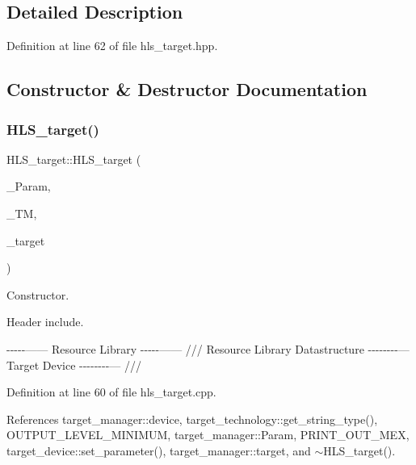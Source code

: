 \subsection{Detailed Description}


Definition at line 62 of file hls\+\_\+target.\+hpp.



\subsection{Constructor \& Destructor Documentation}
\mbox{\label{classHLS__target_ac3a4f4a023bf8fceb35226d71bf2ad44}} 
\subsubsection{\texorpdfstring{H\+L\+S\+\_\+target()}{HLS\_target()}}
{\footnotesize\ttfamily H\+L\+S\+\_\+target\+::\+H\+L\+S\+\_\+target (\begin{DoxyParamCaption}\item[{const \hyperlink{Parameter_8hpp_a37841774a6fcb479b597fdf8955eb4ea}{Parameter\+Const\+Ref} \&}]{\+\_\+\+Param,  }\item[{const \hyperlink{technology__manager_8hpp_a4b9ecd440c804109c962654f9227244e}{technology\+\_\+manager\+Ref} \&}]{\+\_\+\+TM,  }\item[{const \hyperlink{target__device_8hpp_acedb2b7a617e27e6354a8049fee44eda}{target\+\_\+device\+Ref} \&}]{\+\_\+target }\end{DoxyParamCaption})}



Constructor. 

Header include.

-\/-\/-\/-\/-\/------ Resource Library -\/-\/-\/-\/-\/------ /// Resource Library Datastructure -\/-\/-\/-\/-\/-\/-\/-\/--- Target Device -\/-\/-\/-\/-\/-\/-\/-\/--- /// 

Definition at line 60 of file hls\+\_\+target.\+cpp.



References target\+\_\+manager\+::device, target\+\_\+technology\+::get\+\_\+string\+\_\+type(), O\+U\+T\+P\+U\+T\+\_\+\+L\+E\+V\+E\+L\+\_\+\+M\+I\+N\+I\+M\+UM, target\+\_\+manager\+::\+Param, P\+R\+I\+N\+T\+\_\+\+O\+U\+T\+\_\+\+M\+EX, target\+\_\+device\+::set\+\_\+parameter(), target\+\_\+manager\+::target, and $\sim$\+H\+L\+S\+\_\+target().



